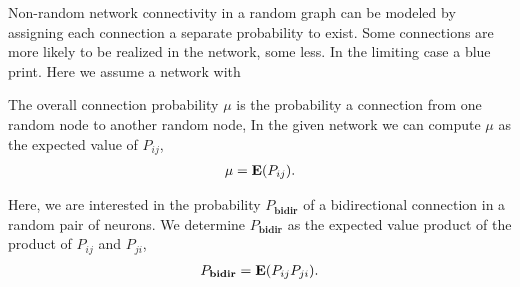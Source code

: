 






Non-random network connectivity in a random graph can be modeled by assigning each connection a separate probability to exist. Some connections are more likely to be realized in the network, some less. In the limiting case a blue print. Here we assume a network with 

The overall connection probability $\mu$ is the probability a connection from one random node to another random node, In the given network we can compute $\mu$ as the expected value of $P_{ij}$,
\begin{align}
\mu = \operatorname{\mathbf{E}}(P_{ij}).
\end{align}



Here, we are interested in the probability $P_{\mathbf{bidir}}$ of a bidirectional connection in a random pair of neurons. We determine $P_{\mathbf{bidir}}$ as the expected value product of the product of $P_{ij}$ and $P_{ji}$,
%
\begin{align}
P_{\mathbf{bidir}} = \operatorname{\mathbf{E}}(P_{ij} P_{ji}).
\end{align}
%

